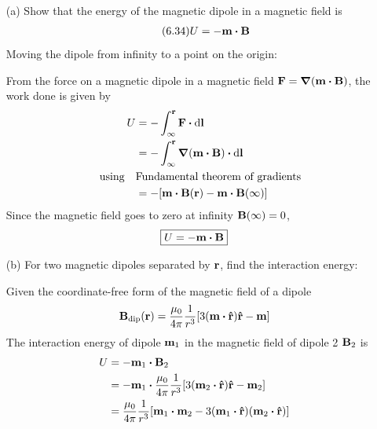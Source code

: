 \documentclass[../main.tex]{subfiles}
\begin{document}
\begin{itemize}
    \item [(a)] Show that the energy of the magnetic dipole in a magnetic field is
    \begin{align*} \tag{6.34}
        U = -\vb m \vdot \vb B
    \end{align*}
    Moving the dipole from infinity to a point on the origin:
    
    From the force on a magnetic dipole in a magnetic field $\vb F = \grad(\vb m \vdot \vb B)$,
    the work done is given by
    \begin{align*}
        U &= - \int_\infty^{\vb r} \vb F \vdot \dd{\vb l} \\
        &= -\int_\infty^{\vb r} \grad(\vb m \vdot \vb B) \vdot \dd{\vb l} \\
        \qusing &\textrm{Fundamental theorem of gradients} \\
        &= - \qt[\vb m \vdot \vb B(\vb r) - \vb m \vdot \vb B(\infty)]
    \end{align*}
    Since the magnetic field goes to zero at infinity $\vb B(\infty) = 0$,
    \begin{align*}
        \boxed{U = -\vb m \vdot \vb B}
    \end{align*}
    \item [(b)] For two magnetic dipoles separated by $\vb r$, find the interaction energy:

    Given the coordinate-free form of the magnetic field of a dipole
    \begin{align*}
        \vb B_\text{dip} (\vb r) &= \frac{\mu_0}{4\pi} \frac{1}{r^3} [3 (\vb m \vdot \vu r) \vu r - \vb m] \\
    \end{align*}
    The interaction energy of dipole $\vb m_1$ in the magnetic field of dipole 2 $\vb B_2$ is
    \begin{align*}
        U &= -\vb m_1 \vdot \vb B_2 \\
        &= -\vb m_1 \vdot \frac{\mu_0}{4\pi} \frac{1}{r^3} [3 (\vb m_2 \vdot \vu r) \vu r - \vb m_2] \\
        &= \frac{\mu_0}{4\pi} \frac{1}{r^3} [\vb m_1 \vdot \vb m_2 - 3 (\vb m_1 \vdot \vu r) (\vb m_2 \vdot \vu r)]
    \end{align*}


\end{itemize}
\end{document}
